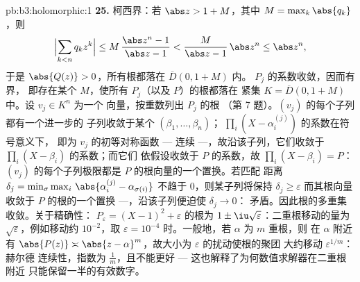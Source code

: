 \begin{solution}{pb:b3:holomorphic:1}
\textbf{25.} 柯西界：若 $\abs z > 1 + M$，其中 $M =
\max_k\abs{q_k}$，则
\[
\Bigl|\sum_{k<n}q_kz^k\Bigr|
\leq M\,\frac{\abs z^n - 1}{\abs z - 1}
< \frac{M}{\abs z - 1}\,\abs z^n \leq \abs z^n,
\]
于是 $\abs{Q(z)} > 0$，所有根都落在 $\overline D(0, 1+M)$ 内。
$P_j$ 的系数收敛，因而有界，
即存在某个 $M$，使所有 $P_j$（以及 $P$）的根都落在
紧集 $K = \overline D(0, 1 + M)$ 中。设 $v_j \in K^n$ 为一个
向量，按重数列出 $P_j$ 的根
（第 7 题）。$(v_j)$ 的每个子列都有一个进一步的
子列收敛于某个 $(\beta_1, \dots, \beta_n)$；
$\prod_i(X - \alpha_i^{(j)})$ 的系数在符号意义下，
即为 $v_j$ 的初等对称函数 ---
连续 ---，故沿该子列，它们收敛于
$\prod_i(X - \beta_i)$ 的系数；而它们
依假设收敛于 $P$ 的系数，故 $\prod_i(X -
\beta_i) = P$：$(v_j)$ 的每个子列极限都是
$P$ 的根向量的一个置换。若匹配
距离 $\delta_j = \min_\sigma\max_i\,
\abs{\alpha_i^{(j)} - \alpha_{\sigma(i)}}$ 不趋于
$0$，则某子列将保持 $\delta_j \geq \varepsilon$
而其根向量收敛于
$P$ 的根的一个置换 ---，沿该子列便迫使 $\delta_j \to 0$：
矛盾。因此根的多重集收敛。关于精确性：
$P_\varepsilon = (X - 1)^2 + \varepsilon$ 的根为 $1 \pm
\iu\sqrt\varepsilon$：二重根移动的量为
$\sqrt\varepsilon$，例如移动约 $10^{-2}$，取 $\varepsilon =
10^{-4}$ 时。一般地，若 $\alpha$ 为 $m$ 重根，则
在 $\alpha$ 附近有 $\abs{P(z)} \asymp \abs{z -
\alpha}^m$，故大小为 $\varepsilon$ 的扰动使根的聚团
大约移动 $\varepsilon^{1/m}$：赫尔德
连续性，指数为 $\frac1m$，且不能更好 ---
这也解释了为何数值求解器在二重根附近
只能保留一半的有效数字。
\end{solution}
